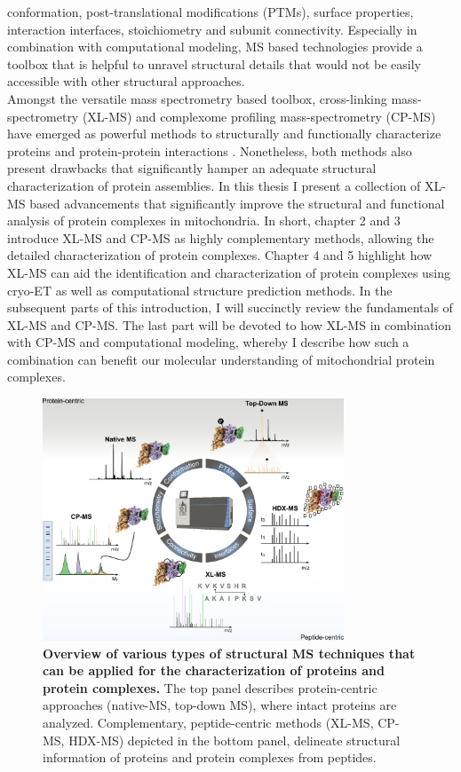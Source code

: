 conformation, post-translational modifications (PTMs), surface properties, interaction interfaces, stoichiometry and subunit connectivity. Especially in combination with computational modeling, MS based technologies provide a toolbox that is helpful to unravel structural details that would not be easily accessible with other structural approaches.\\
Amongst the versatile mass spectrometry based toolbox, cross-linking mass-spectrometry (XL-MS) and complexome profiling mass-spectrometry (CP-MS) have emerged as powerful methods to structurally and functionally characterize proteins and protein-protein interactions \cite{Steigenberger_2020}. Nonetheless, both methods also present drawbacks that significantly hamper an adequate structural characterization of protein assemblies. In this thesis I present a collection of XL-MS based advancements that significantly improve the structural and functional analysis of protein complexes in mitochondria. In short, chapter 2 and 3 introduce XL-MS and CP-MS as highly complementary methods, allowing the detailed characterization of protein complexes. Chapter 4 and 5 highlight how XL-MS can aid the identification and characterization of protein complexes using cryo-ET as well as computational structure prediction methods. In the subsequent parts of this introduction, I will succinctly review the fundamentals of XL-MS and CP-MS. The last part will be devoted to how XL-MS in combination with CP-MS and computational modeling, whereby I describe how such a combination can benefit our molecular understanding of mitochondrial protein complexes.

\begin{figure}[hbt!]
    \center
    \includegraphics[width=0.8\textwidth]{Chapter.1/Figures/Figure1} 
    \caption{\textbf{Overview of various types of structural MS techniques that can be applied for the characterization of proteins and protein complexes.} The top panel describes protein-centric approaches (native-MS, top-down MS), where intact proteins are analyzed. Complementary, peptide-centric methods (XL-MS, CP-MS, HDX-MS) depicted in the bottom panel, delineate structural information of proteins and protein complexes from peptides.}
    \label{fig:fig1}
\end{figure}

